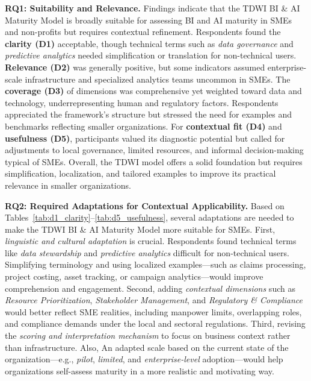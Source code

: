 \documentclass[conference]{IEEEtran}
\begin{document}
\textbf{RQ1: Suitability and Relevance.} Findings indicate that the TDWI BI \& AI Maturity Model is broadly suitable for assessing BI and AI maturity in SMEs and non-profits but requires contextual refinement.  
Respondents found the \textbf{clarity (D1)} acceptable, though technical terms such as \emph{data governance} and \emph{predictive analytics} needed simplification or translation for non-technical users.  
\textbf{Relevance (D2)} was generally positive, but some indicators assumed enterprise-scale infrastructure and specialized analytics teams uncommon in SMEs.  
The \textbf{coverage (D3)} of dimensions was comprehensive yet weighted toward data and technology, underrepresenting human and regulatory factors. Respondents appreciated the framework’s structure but stressed the need for examples and benchmarks reflecting smaller organizations.  
For \textbf{contextual fit (D4)} and \textbf{usefulness (D5)}, participants valued its diagnostic potential but called for adjustments to local governance, limited resources, and informal decision-making typical of SMEs.  
Overall, the TDWI model offers a solid foundation but requires simplification, localization, and tailored examples to improve its practical relevance in smaller organizations.


\textbf{RQ2: Required Adaptations for Contextual Applicability.} Based on Tables~\ref{tab:d1_clarity}–\ref{tab:d5_usefulness}, several adaptations are needed to make the TDWI BI \& AI Maturity Model more suitable for SMEs.  
First, \textit{linguistic and cultural adaptation} is crucial. Respondents found technical terms like \textit{data stewardship} and \textit{predictive analytics} difficult for non-technical users. Simplifying terminology and using localized examples---such as claims processing, project costing, asset tracking, or campaign analytics---would improve comprehension and engagement.  
Second, adding \textit{contextual dimensions} such as \textit{Resource Prioritization}, \textit{Stakeholder Management}, and \textit{Regulatory \& Compliance} would better reflect SME realities, including manpower limits, overlapping roles, and compliance demands under the local and sectoral regulations.  
Third, revising the \textit{scoring and interpretation mechanism} to focus on business context rather than infrastructure. Also, An adapted scale based on the current state of the organization---e.g., \emph{pilot}, \emph{limited}, and \emph{enterprise-level} adoption---would help organizations self-assess maturity in a more realistic and motivating way.
\end{document}
